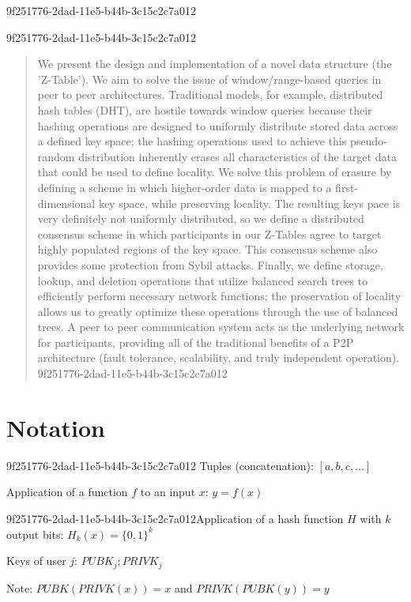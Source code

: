 \documentclass[12pt]{article}
\begin{document}
9f251776-2dad-11e5-b44b-3c15c2c7a012\maketitle

9f251776-2dad-11e5-b44b-3c15c2c7a012\begin{abstract}
We present the design and implementation of a novel data structure (the 'Z-Table'). We aim to solve the issue of window/range-based queries in peer to peer architectures. Traditional models, for example,  distributed hash tables (DHT), are hostile towards window queries because their hashing operations are designed to uniformly distribute stored data across a defined key space; the hashing operations used to achieve this pseudo-random distribution inherently erases all characteristics of the target data that could be used to define locality. We solve this problem of erasure by defining a scheme in which higher-order data is mapped to a first-dimensional key space, while preserving locality. The resulting keys pace is very definitely not uniformly distributed, so we define a distributed consensus scheme in which participants in our Z-Tables agree to target highly populated regions of the key space. This consensus scheme also provides some protection from Sybil attacks. Finally, we define storage, lookup, and deletion operations that utilize balanced search trees to efficiently perform necessary network functions; the preservation of locality allows us to greatly optimize these operations through the use of balanced trees. A peer to peer communication system acts as the underlying network for participants, providing all of the traditional benefits of a P2P architecture (fault tolerance, scalability, and truly independent operation).
9f251776-2dad-11e5-b44b-3c15c2c7a012\end{abstract}

\section{Notation}
9f251776-2dad-11e5-b44b-3c15c2c7a012
Tuples (concatenation): $[a,b,c,...]$

Application of a function $f$ to an input $x$: $y=f(x)$

9f251776-2dad-11e5-b44b-3c15c2c7a012Application of a hash function $H$ with $k$ output bits: $H_{k}(x) = \{0,1\}^k$

Keys of user $j$: $ PUBK_j; PRIVK_j $

Note: $PUBK(PRIVK(x)) = x$ and $PRIVK(PUBK(y)) = y$~
\end{document}
